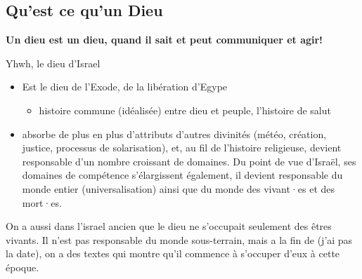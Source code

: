 \subsection{Qu'est ce qu'un Dieu}
\begin{center}
    \textbf{Un dieu est un dieu, quand il sait et peut communiquer et agir!}
\end{center}
\begin{parag}{Yhwh, le dieu d'Israel}
    \begin{itemize}
        \item Est le dieu de l'Exode, de la libération d'Egype
			\begin{itemize}
				\item histoire commune (idéalisée) entre dieu et peuple, l'histoire de salut
			\end{itemize}
		\item absorbe de plus en plus d'attributs d'autres divinités (météo, création, justice, processus de solarisation), et, au fil de l'histoire religieuse, devient responsable d'un nombre croissant de domaines. Du point de vue d'Israël, ses domaines de compétence s'élargissent également, il devient responsable du monde entier (universalisation) ainsi que du monde des vivant·es et des mort·es.
    \end{itemize}
    On a aussi dans l'israel ancien que le dieu ne s'occupait seulement des êtres vivants. Il n'est pas responsable du monde sous-terrain, mais a la fin de (j'ai pas la date), on a des textes qui montre qu'il commence à s'occuper d'eux à cette époque.
\end{parag}




